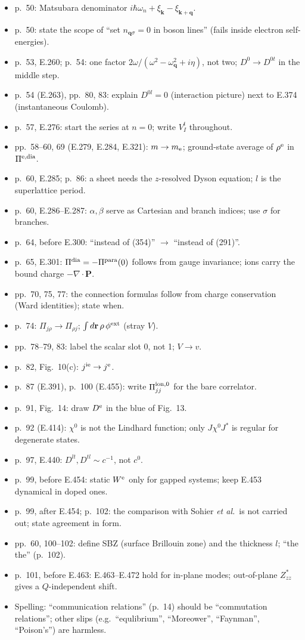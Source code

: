 \documentclass[11pt]{article}
\begin{document}
\begin{itemize}
\item p.~50: Matsubara denominator $i\hbar\omega_n+\xi_{\mathbf k}-\xi_{\mathbf k+\mathbf q}$.
\item p.~50: state the scope of ``set $n_{\mathbf q\sigma}=0$ in boson lines'' (fails inside electron self-energies).
\item p.~53, E.260; p.~54: one factor $2\omega/(\omega^2-\omega^2_{\mathbf q}+i\eta)$, not two; $D^0\to D^{0t}$ in the middle step.
\item p.~54 (E.263), pp.~80, 83: explain $D^{0l}=0$ (interaction picture) next to E.374 (instantaneous Coulomb).
\item p.~57, E.276: start the series at $n=0$; write $V^t_I$ throughout.
\item pp.~58--60, 69 (E.279, E.284, E.321): $m\to m_{\rm e}$; ground-state average of $\rho^{\rm e}$ in $\Pi^{\rm e,dia}$.
\item p.~60, E.285; p.~86: a sheet needs the $z$-resolved Dyson equation; $l$ is the superlattice period.
\item p.~60, E.286--E.287: $\alpha,\beta$ serve as Cartesian and branch indices; use $\sigma$ for branches.
\item p.~64, before E.300: ``instead of (354)'' $\to$ ``instead of (291)''.
\item p.~65, E.301: $\Pi^{\rm dia}=-\Pi^{\rm para}(0)$ follows from gauge invariance; ions carry the bound charge $-\nabla\cdot\mathbf P$.
\item pp.~70, 75, 77: the connection formulas follow from charge conservation (Ward identities); state when.
\item p.~74: $\Pi_{j\rho}\to\Pi_{\rho j}$; $\int d\mathbf r\,\rho\,\phi^{\rm ext}$ (stray $V$).
\item pp.~78--79, 83: label the scalar slot 0, not 1; $V\to v$.
\item p.~82, Fig.~10(c): $j^{\rm ie}\to j^{\rm e}$.
\item p.~87 (E.391), p.~100 (E.455): write $\Pi^{\rm ion,0}_{jj}$ for the bare correlator.
\item p.~91, Fig.~14: draw $D^{\rm e}$ in the blue of Fig.~13.
\item p.~92 (E.414): $\chi^0$ is not the Lindhard function; only $J\chi^0J^*$ is regular for degenerate states.
\item p.~97, E.440: $D^{lt},D^{tl}\sim c^{-1}$, not $c^0$.
\item p.~99, before E.454: static $W^{\rm e}$ only for gapped systems; keep E.453 dynamical in doped ones.
\item p.~99, after E.454; p.~102: the comparison with Sohier \textit{et al.}\ is not carried out; state agreement in form.
\item pp.~60, 100--102: define SBZ (surface Brillouin zone) and the thickness $l$; ``the the'' (p.~102).
\item p.~101, before E.463: E.463--E.472 hold for in-plane modes; out-of-plane $Z^*_{zz}$ gives a $Q$-independent shift.
\item Spelling: ``communication relations'' (p.~14) should be ``commutation relations''; other slips (e.g.\ ``equlibrium'', ``Moreower'', ``Faynman'', ``Poison's'') are harmless.
\end{itemize}
\end{document}
